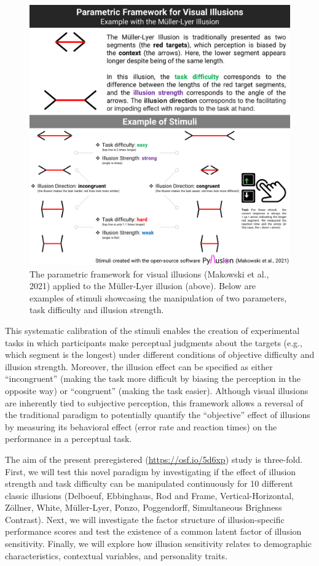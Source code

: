 \documentclass[
  man,floatsintext]{apa6}
\begin{document}
\begin{figure}
\includegraphics[width=1\linewidth]{../../figures/Figure1} \caption{The parametric framework for visual illusions (Makowski et al., 2021) applied to the Müller-Lyer illusion (above). Below are examples of stimuli showcasing the manipulation of two parameters, task difficulty and illusion strength.}\label{fig:unnamed-chunk-2}
\end{figure}

This systematic calibration of the stimuli enables the creation of experimental tasks in which participants make perceptual judgments about the targets (e.g., which segment is the longest) under different conditions of objective difficulty and illusion strength. Moreover, the illusion effect can be specified as either ``incongruent'' (making the task more difficult by biasing the perception in the opposite way) or ``congruent'' (making the task easier). Although visual illusions are inherently tied to subjective perception, this framework allows a reversal of the traditional paradigm to potentially quantify the ``objective'' effect of illusions by measuring its behavioral effect (error rate and reaction times) on the performance in a perceptual task.

The aim of the present preregistered (\url{https://osf.io/5d6xp}) study is three-fold. First, we will test this novel paradigm by investigating if the effect of illusion strength and task difficulty can be manipulated continuously for 10 different classic illusions (Delboeuf, Ebbinghaus, Rod and Frame, Vertical-Horizontal, Zöllner, White, Müller-Lyer, Ponzo, Poggendorff, Simultaneous Brighness Contrast). Next, we will investigate the factor structure of illusion-specific performance scores and test the existence of a common latent factor of illusion sensitivity. Finally, we will explore how illusion sensitivity relates to demographic characteristics, contextual variables, and personality traits.
\end{document}
